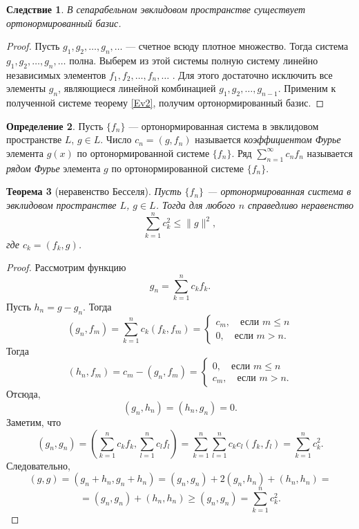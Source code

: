 \documentclass[12pt, titlepage, oneside]{amsbook}
\newtheorem{theorem}{Теорема}[chapter]
\newtheorem{corollary}[theorem]{Следствие}
\theoremstyle{definition}
\newtheorem{definition}[theorem]{Определение}
\theoremstyle{remark}
\begin{document}
\begin{corollary}
	\label{Ev3}
	В сепарабельном эвклидовом пространстве существует ортонормированный базис.
\end{corollary}

\begin{proof}
	Пусть $g_1,g_2,\ldots, g_n,\ldots$ --- счетное всюду плотное множество. Тогда система $g_1,g_2,\ldots, g_n,\ldots$ полна. Выберем из этой системы полную систему линейно независимых элементов $f_1,f_2,\ldots, f_n,\ldots$ . Для этого достаточно исключить все элементы $g_n$, являющиеся линейной комбинацией $g_1,g_2,\ldots, g_{n-1}$. Применим к полученной системе теорему \ref{Ev2}, получим ортонормированный базис.
\end{proof}


\begin{definition}
	Пусть $\{f_n\}$ --- ортонормированная система в эвклидовом пространстве $L$, $g\in L$. Число $c_n=(g,f_n)$ называется \emph{коэффициентом Фурье} элемента $g(x)$ по ортонормированной системе $\{f_n\}$. Ряд $\sum\limits_{n=1}^{\infty} c_n f_n$ называется \emph{рядом Фурье} элемента $g$ по ортонормированной системе $\{f_n\}$.
\end{definition}


\begin{theorem}[неравенство Бесселя]
	\label{Bes}
	Пусть $\{f_n\}$ --- ортонормированная система в эвклидовом пространстве $L$, $g\in L$. Тогда для любого $n$ справедливо неравенство $$\sum\limits_{k=1}^n c_k^2\leq \|g\|^2,$$ где $c_k=(f_k,g)$.
\end{theorem}

\begin{proof}
	Рассмотрим функцию $$g_n=\sum\limits_{k=1}^n c_kf_k.$$ Пусть $h_n=g-g_n$. Тогда $$(g_n,f_m)=\sum\limits_{k=1}^n c_k(f_k,f_m)=\begin{cases}c_m,\quad\text{если $m\leq n$} \\
			0,\quad\text{если $m>n$}.\end{cases}$$ Тогда $$(h_n,f_m)=c_m-(g_n,f_m)=\begin{cases}0,\quad\text{если $m\leq n$} \\
			c_m,\quad\text{если $m>n$}.\end{cases}$$ Отсюда, $$(g_n,h_n)=(h_n,g_n)=0.$$ Заметим, что $$(g_n,g_n)=\left(\sum\limits_{k=1}^n c_kf_k,\sum\limits_{l=1}^n c_lf_l\right)=\sum\limits_{k=1}^n\sum\limits_{l=1}^nc_k c_l(f_k,f_l)=\sum\limits_{k=1}^n c_k^2.$$ Следовательно, $$(g,g)=(g_n+h_n,g_n+h_n)=(g_n,g_n)+2(g_n,h_n)+(h_n,h_n)=$$ $$=(g_n,g_n)+(h_n,h_n)\geq (g_n,g_n)=\sum\limits_{k=1}^n c_k^2.$$
\end{proof}
\end{document}
